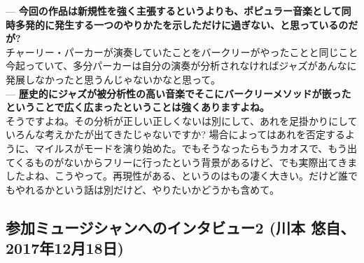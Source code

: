 \documentclass[uplatex,dvipdfmx]{ujarticle}
\begin{document}
\begin{description}
--- {\bf 今回の作品は新規性を強く主張するというよりも、ポピュラー音楽として同時多発的に発生する一つのやりかたを示しただけに過ぎない、と思っているのだが?}\\

チャーリー・パーカーが演奏していたことをバークリーがやったことと同じこと今起っていて、多分パーカーは自分の演奏が分析されなければジャズがあんなに発展しなかったと思うんじゃないかなと思って。\\

--- {\bf 歴史的にジャズが被分析性の高い音楽でそこにバークリーメソッドが嵌ったということで広く広まったということは強くありますよね。}\\

そうですよね。その分析が正しい正しくないは別にして、あれを足掛かりにしていろんな考えかたが出てきたじゃないですか? 場合によってはあれを否定するように、マイルスがモードを演り始めた。でもそうなったらもうカオスで、もう出てくるものがないからフリーに行ったという背景があるけど、でも実際出てきましたよね、こうやって。再現性がある、というのはもの凄く大きい。だけど誰でもやれるかという話は別だけど、やりたいかどうかも含めて。
\end{description}

\subsection{参加ミュージシャンへのインタビュー2 (川本 悠自、2017年12月18日)}
\end{document}
